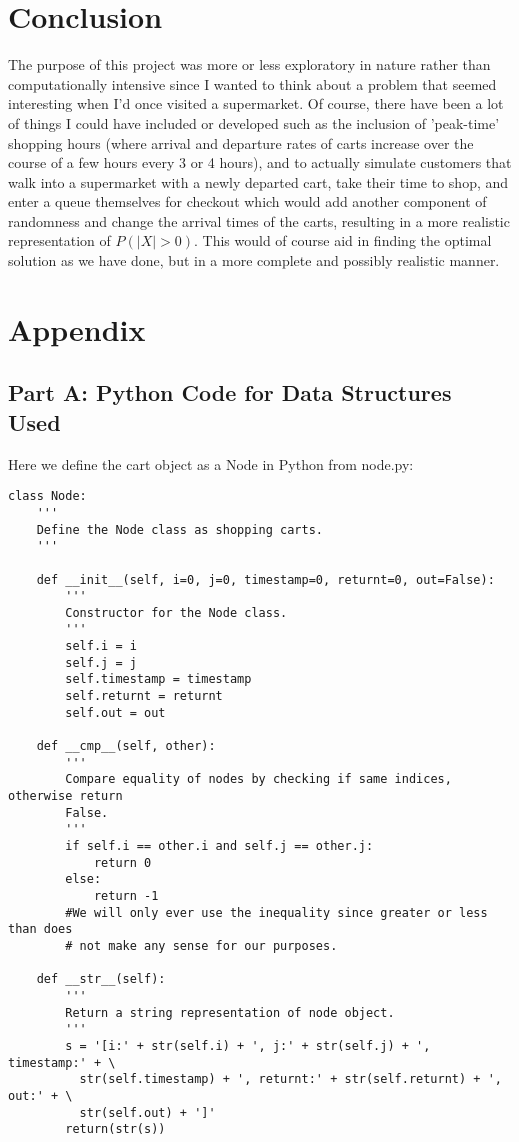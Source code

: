 \documentclass[english]{article}
\begin{document}
\section*{Conclusion}

The purpose of this project was more or less exploratory in nature rather than computationally intensive since I wanted to think about a problem that seemed interesting when I'd once visited a supermarket. Of course, there have been a lot of things I could have included or developed such as the inclusion of 'peak-time' shopping hours (where arrival and departure rates of carts increase over the course of a few hours every 3 or 4 hours), and to actually simulate customers that walk into a supermarket with a newly departed cart, take their time to shop, and enter a queue themselves for checkout which would add another component of randomness and change the arrival times of the carts, resulting in a more realistic representation of $P(|X|>0)$. This would of course aid in finding the optimal solution as we have done, but in a more complete and possibly realistic manner.

\pagebreak
\section*{Appendix}
\subsection*{Part A: Python Code for Data Structures Used}
Here we define the cart object as a Node in Python from node.py:

\begin{singlespace}
\begin{verbatim}
class Node:
    '''
    Define the Node class as shopping carts.
    '''
    
    def __init__(self, i=0, j=0, timestamp=0, returnt=0, out=False):
        '''
        Constructor for the Node class.
        '''
        self.i = i
        self.j = j
        self.timestamp = timestamp
        self.returnt = returnt
        self.out = out
        
    def __cmp__(self, other):
        '''
        Compare equality of nodes by checking if same indices, otherwise return
        False.
        '''
        if self.i == other.i and self.j == other.j:
            return 0
        else:
            return -1
        #We will only ever use the inequality since greater or less than does 
        # not make any sense for our purposes.
    
    def __str__(self):
        '''
        Return a string representation of node object.
        '''
        s = '[i:' + str(self.i) + ', j:' + str(self.j) + ', timestamp:' + \
          str(self.timestamp) + ', returnt:' + str(self.returnt) + ', out:' + \
          str(self.out) + ']'
        return(str(s))

\end{verbatim}
\end{singlespace}
\pagebreak
\end{document}
